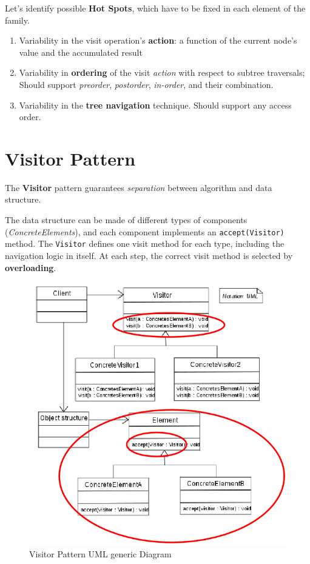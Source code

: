 {Let's identify possible \textbf{Hot Spots}, which have to be fixed in each element of the family.\ns
\begin{enumerate}
   \item Variability in the visit operation’s \textbf{action}:
   a function of the current node’s value and the accumulated result
   \item Variability in \textbf{ordering} of the visit \textit{action} with respect to subtree traversals;
   Should support \textit{preorder},
   \textit{postorder}, \textit{in-order}, and their combination.
   \item Variability in the \textbf{tree navigation} technique. 
   Should support any access order.
\end{enumerate}}

\section{Visitor Pattern}
\begin{paracol}{2}
   \colfill
   The \textbf{Visitor} pattern guarantees \textit{separation} between algorithm
   and data structure.
   \nl

   The data structure can be made of different types of components (\textit{ConcreteElements}), and each component implements an
   \lstinline|accept(Visitor)| method.
   The \lstinline|Visitor| defines one visit method
   for each type, including the navigation logic in itself.
   At each step, the correct visit method
   is selected by \textbf{overloading}.
   \colfill
   \switchcolumn

   \begin{figure}[htbp]
      \centering
      \includegraphics[width=0.9\columnwidth]{images/visitorpattern_uml.png}
      \caption{Visitor Pattern UML generic Diagram}
      \label{fig:visitorpattern_uml}
   \end{figure}
\end{paracol}

